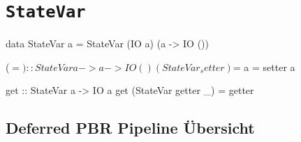 \section[StateVar]{\texttt{StateVar}}
\label{sec:src-statevar}

\begin{haskell}[label={lst:statevar},caption={Definition \texttt{StateVar}}]
data StateVar a = StateVar (IO a) (a -> IO ())

($=) :: StateVar a -> a -> IO ()
(StateVar _ setter) $= a = setter a

get :: StateVar a -> IO a
get (StateVar getter _) = getter
\end{haskell}

\begin{landscape}
\section{Deferred PBR Pipeline Übersicht}
\label{sec:src-pipeline}

\end{landscape}
